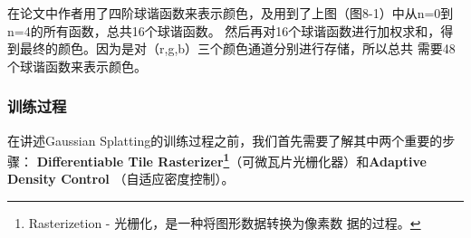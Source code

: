 \documentclass{nwputhesis}
\begin{document}
\indent
在论文中作者用了四阶球谐函数来表示颜色，及用到了上图（图8-1）中从n=0到n=4的所有函数，总共16个球谐函数。
然后再对16个球谐函数进行加权求和，得到最终的颜色。因为是对（r,g,b）三个颜色通道分别进行存储，所以总共
需要48个球谐函数来表示颜色。\\


\subsubsection{训练过程}
\indent
在讲述Gaussian Splatting的训练过程之前，我们首先需要了解其中两个重要的步骤：
\textbf{Differentiable Tile Rasterizer\footnote{Rasterizetion - 光栅化，是一种将图形数据转换为像素数
据的过程。}}（可微瓦片光栅化器）和\textbf{Adaptive Density Control}
（自适应密度控制）。\\
\end{document}
